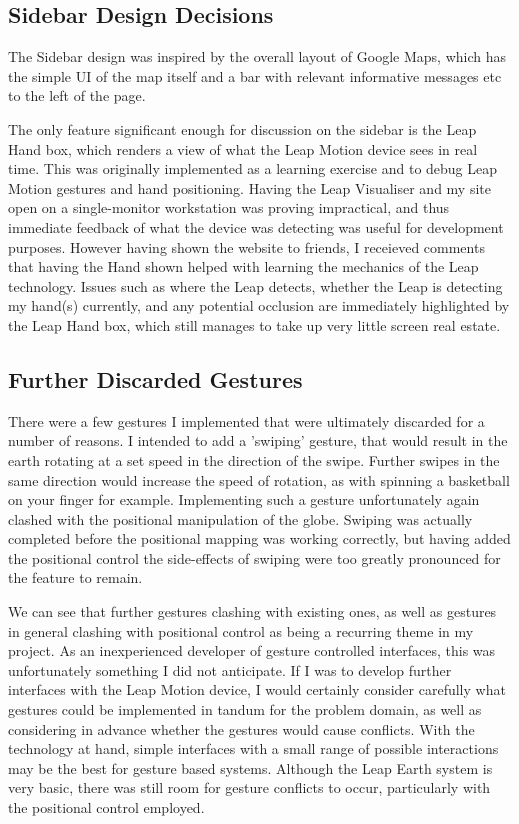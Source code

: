 \documentclass{sigplanconf}
\begin{document}
\subsection{Sidebar Design Decisions}

The Sidebar design was inspired by the overall layout of Google Maps, which has the simple UI of the map itself and a bar with relevant informative messages etc to the left of the page. 

The only feature significant enough for discussion on the sidebar is the Leap Hand box, which renders a view of what the Leap Motion device sees in real time. This was originally implemented as a learning exercise and to debug Leap Motion gestures and hand positioning. Having the Leap Visualiser and my site open on a single-monitor workstation was proving impractical, and thus immediate feedback of what the device was detecting was useful for development purposes. However having shown the website to friends, I receieved comments that having the Hand shown helped with learning the mechanics of the Leap technology. Issues such as where the Leap detects, whether the Leap is detecting my hand(s) currently, and any potential occlusion are immediately highlighted by the Leap Hand box, which still manages to take up very little screen real estate. 

\subsection{Further Discarded Gestures}

There were a few gestures I implemented that were ultimately discarded for a number of reasons. I intended to add a 'swiping' gesture, that would result in the earth rotating at a set speed in the direction of the swipe. Further swipes in the same direction would increase the speed of rotation, as with spinning a basketball on your finger for example. Implementing such a gesture unfortunately again clashed with the positional manipulation of the globe. Swiping was actually completed before the positional mapping was working correctly, but having added the positional control the side-effects of swiping were too greatly pronounced for the feature to remain.

We can see that further gestures clashing with existing ones, as well as gestures in general clashing with positional control as being a recurring theme in my project. As an inexperienced developer of gesture controlled interfaces, this was unfortunately something I did not anticipate. If I was to develop further interfaces with the Leap Motion device, I would certainly consider carefully what gestures could be implemented in tandum for the problem domain, as well as considering in advance whether the gestures would cause conflicts. With the technology at hand, simple interfaces with a small range of possible interactions may be the best for gesture based systems. Although the Leap Earth system is very basic, there was still room for gesture conflicts to occur, particularly with the positional control employed.
\end{document}
